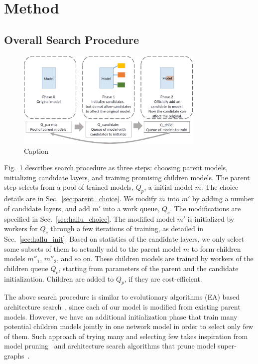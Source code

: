 \documentclass{article}
\begin{document}
\section{Method}

\subsection{Overall Search Procedure}
\label{sec:search_procedure}

\begin{figure}
    \centering
    \includegraphics[width=0.8\textwidth]{img/three_queues.png}
    \caption{Caption}
    \label{fig:search_procedure}
\end{figure}

Fig.~\ref{fig:search_procedure} describes search procedure as three steps: choosing parent models, initializing candidate layers, and training promising children models. The parent step selects from a pool of trained models, $Q_{p}$, a initial model $m$. The choice details are in Sec.~\ref{sec:parent_choice}. We modify $m$ into $m'$ by adding a number of candidate layers, and add $m'$ into a work queue, $Q_{c}$. The modifications are specified in Sec.~\ref{sec:hallu_choice}. The modified model $m'$ is initialized by workers for $Q_{c}$ through a few iterations of training, as detailed in Sec.~\ref{sec:hallu_init}. 
Based on statistics of the candidate layers, we only select some subsets of them to actually add to the parent model $m$ to form children models $m''_1$, $m''_2$, and so on. These children models are trained by workers of the children queue $Q_{c}$, starting from parameters of the parent and the candidate initialization. Children are added to $Q_p$, if they are cost-efficient. 

The above search procedure is similar to evolutionary algorithms (EA) based architecture search~\citep{Real2018RegularizedEF, Elsken2018EfficientMN}, since each of our model is modified from existing parent models. However, we have an additional initialization phase that train many potential children models jointly in one network model in order to select only few of them. Such approach of trying many and selecting few takes inspiration from model pruning~\citep{huang2017condensenet} and architecture search algorithms that prune model super-graphs~\citep{Pham2018EfficientNA, Liu2018DARTSDA}.
\end{document}
